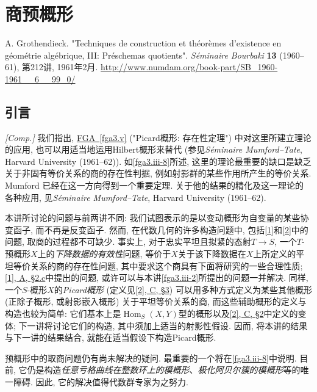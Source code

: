 \part{商预概形}\label{fga3.iii}\thispagestyle{fancy}
\begin{original}{}\label{fga3.iii-original-citation}\skipsinglepar
\par{}A. Grothendieck. "Techniques de construction et théorèmes d'existence en géométrie algébrique, III: Préschemas quotients". \emph{Séminaire Bourbaki} \textbf{13} (1960–61), 第212讲, 1961年2月. \url{http://www.numdam.org/book-part/SB_1960-1961__6__99_0/}
\end{original}
\chapter{引言}\thispagestyle{fancy}\label{fga3.iii-introduction}
\begin{remark}{}\label{fga3.iii-introduction-remark}\skipsinglepar
\par{}\emph{[Comp.]} 我们指出, \hyperref[fga3.v]{FGA~\ref*{fga3.v}} ("Picard概形: 存在性定理") 中对这里所建立理论的应用, 也可以用适当地运用Hilbert概形来替代 (参见\emph{Séminaire Mumford–Tate}, Harvard University (1961–62)). 如\cref{fga3.iii-8}所述, 这里的理论最重要的缺口是缺乏关于非固有等价关系的商的存在性判据, 例如射影群的某些作用所产生的等价关系. Mumford \cite{Mum1961} 已经在这一方向得到一个重要定理. 关于他的结果的精化及这一理论的各种应用, 见\emph{Séminaire Mumford–Tate}, Harvard University (1961–62).
\end{remark}
\par{}本讲所讨论的问题与前两讲不同: 我们试图表示的是以变动概形为自变量的某些协变函子, 而不再是反变函子. 然而, 在代数几何的许多构造问题中, 包括\hyperref[fga3.i]{[1]}和\hyperref[fga3.ii]{[2]}中的问题, 取商的过程都不可缺少. 事实上, 对于忠实平坦且拟紧的态射\(T\to  S\), 一个\(T\)-预概形\(X\)上的\emph{下降数据的有效性}问题, 等价于\(X\)关于该下降数据在\(X\)上所定义的平坦等价关系的商的存在性问题, 其中要求这个商具有下面将研究的一些合理性质; \hyperref[fga3.i-a.2.c]{[1], A, §2.c}中提出的问题, 或许可以与本讲\cref{fga3.iii-2}所提出的问题一并解决. 同样, 一个\(S\)-概形\(X\)的\emph{Picard概形} (定义见\hyperref[fga3.ii-c.3]{[2], C, §3}) 可以用多种方式定义为某些其他概形 (正除子概形, 或射影嵌入概形) 关于平坦等价关系的商, 而这些辅助概形的定义与构造也较为简单: 它们基本上是\(\operatorname {Hom}_S(X,Y)\)型的概形以及\hyperref[fga3.ii-c.2]{[2], C, §2}中定义的变体; 下一讲将讨论它们的构造, 其中须加上适当的射影性假设. 因而, 将本讲的结果与下一讲的结果结合, 就能在适当假设下构造Picard概形.
\par{}预概形中的取商问题仍有尚未解决的疑问. 最重要的一个将在\cref{fga3.iii-8}中说明. 目前, 它仍是构造\emph{任意亏格曲线在整数环上的模概形}、\emph{极化阿贝尔簇的模概形}等的唯一障碍. 因此, 它的解决值得代数群专家为之努力.
